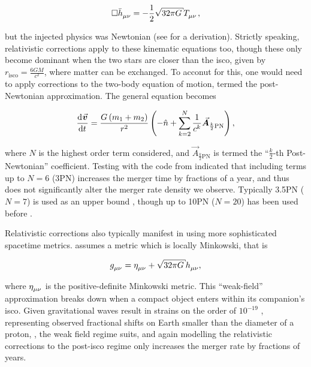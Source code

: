 \begin{equation}
    \Box \tensor{\bar{h}}{_{\mu\nu}} = -\frac12 \sqrt{32\pi G}\tensor{T}{_{\mu\nu}},\label{eq:GW_spacetime_equation}
\end{equation}

but the injected physics was Newtonian (see  for a derivation). Strictly speaking, relativistic corrections apply to these kinematic equations too, though these only become dominant when the two stars are closer than the \gls{isco}, given by $r_\text{isco}=\frac{6GM}{c^2}$, where matter can be exchanged. To acconut for this, one would need to apply corrections to the two-body equation of motion, termed the post-Newtonian approximation. The general equation becomes

\begin{equation}
    \dv{\vec{v}}{t} = \frac{G\left(m_1+m_2\right)}{r^2}\left(-\hat{n} + \sum_{k=2}^N \frac{1}{c^k}\vec{A}_{\frac{k}{2}\text{PN}} \right),
\end{equation}

where $N$ is the highest order term considered, and $\vec{A}_{\frac{k}{2}\text{PN}}$ is termed the ``$\frac{k}{2}$-th Post-Newtonian'' coefficient. Testing with the  code from \citet{Van_zeist:2021} indicated that including terms up to $N=6$ (3PN) increases the merger time by fractions of a year, and thus does not significantly alter the merger rate density we observe.  Typically 3.5PN ($N=7$) is used as an upper bound \citep{Itoh:2003}, though up to 10PN ($N=20$) has been used before \citep[][and references therein]{Blanchet:2014}.

Relativistic corrections also typically manifest in using more sophisticated spacetime metrics.  assumes a metric which is locally Minkowski, that is

\begin{equation}
    \tensor{g}{_{\mu\nu}} = \tensor{\eta}{_{\mu\nu}}+\sqrt{32\pi G} \tensor{h}{_{\mu\nu}},
\end{equation}

where $\tensor{\eta}{_{\mu\nu}}$ is the positive-definite Minkowski metric. This ``weak-field'' approximation breaks down when a compact object enters within its companion's \gls{isco}. Given gravitational waves result in strains on the order of $10^{-19}$ \citep{Van_zeist:2023}, representing observed fractional shifts on Earth smaller than the diameter of a proton, \citep{Moore:2014}, the weak field regime suits, and again modelling the relativistic corrections to the post-\gls{isco} regime only increases the merger rate by fractions of years.

